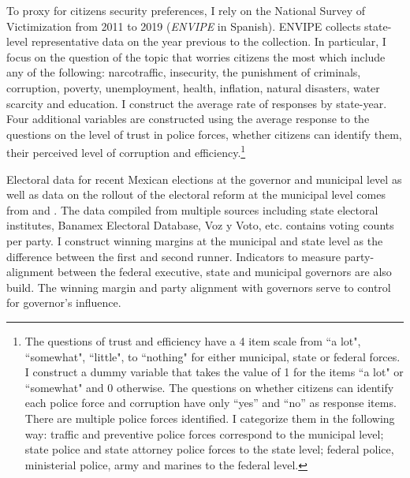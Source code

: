 To proxy for citizens security preferences, I rely on the National Survey of Victimization from 2011 to 2019 (\emph{ENVIPE} in Spanish). ENVIPE collects state-level representative data on the year previous to the collection.  In particular, I focus on the question of the topic that worries citizens the most which include any of the following: narcotraffic, insecurity, the punishment of criminals, corruption, poverty, unemployment, health, inflation, natural disasters, water scarcity and education. I construct the average rate of responses by state-year. Four additional variables are constructed using the average response to the questions on the level of trust in police forces, whether citizens can identify them, their perceived level of corruption and efficiency.\footnote{The questions of trust and efficiency have a 4 item scale from ``a lot", ``somewhat", ``little", to  ``nothing" for either municipal, state or federal forces. I construct a dummy variable that takes the value of 1 for the items ``a lot" or ``somewhat" and 0 otherwise. The questions on whether citizens can identify each police force and corruption have only ``yes'' and ``no'' as response items. There are multiple police forces identified. I categorize them in the following way: traffic and preventive police forces correspond to the municipal level; state police and state attorney police forces to the state level; federal police, ministerial police, army and marines to the federal level.} 
 
Electoral data for recent Mexican elections at the governor and municipal level as well as data on the rollout of the electoral reform at the municipal level comes from \citet{magar_2012} and \citet{magar_2017}. The data compiled from multiple sources including state electoral institutes, Banamex Electoral Database, Voz y Voto, etc. contains voting counts per party. I construct winning margins at the municipal and state level as the difference between the first and second runner. Indicators to measure party-alignment between the federal executive, state and municipal governors are also build. The winning margin and party alignment with governors serve to control for governor's influence. 


